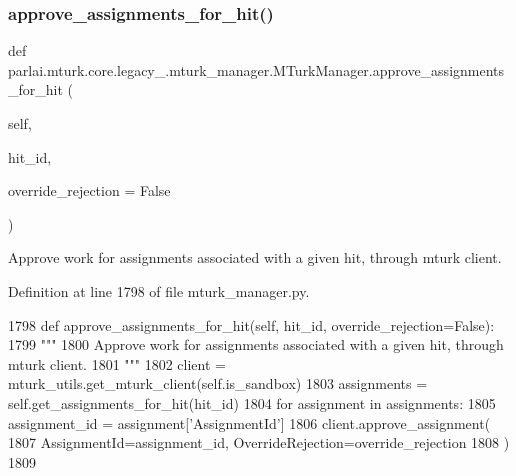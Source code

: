 \subsubsection{\texorpdfstring{approve\+\_\+assignments\+\_\+for\+\_\+hit()}{approve\_assignments\_for\_hit()}}
{\footnotesize\ttfamily def parlai.\+mturk.\+core.\+legacy\+\_.\+mturk\+\_\+manager.\+M\+Turk\+Manager.\+approve\+\_\+assignments\+\_\+for\+\_\+hit (\begin{DoxyParamCaption}\item[{}]{self,  }\item[{}]{hit\+\_\+id,  }\item[{}]{override\+\_\+rejection = {\ttfamily False} }\end{DoxyParamCaption})}

\begin{DoxyVerb}Approve work for assignments associated with a given hit, through mturk client.
\end{DoxyVerb}
 

Definition at line 1798 of file mturk\+\_\+manager.\+py.


\begin{DoxyCode}
1798     \textcolor{keyword}{def }approve\_assignments\_for\_hit(self, hit\_id, override\_rejection=False):
1799         \textcolor{stringliteral}{"""}
1800 \textcolor{stringliteral}{        Approve work for assignments associated with a given hit, through mturk client.}
1801 \textcolor{stringliteral}{        """}
1802         client = mturk\_utils.get\_mturk\_client(self.is\_sandbox)
1803         assignments = self.get\_assignments\_for\_hit(hit\_id)
1804         \textcolor{keywordflow}{for} assignment \textcolor{keywordflow}{in} assignments:
1805             assignment\_id = assignment[\textcolor{stringliteral}{'AssignmentId'}]
1806             client.approve\_assignment(
1807                 AssignmentId=assignment\_id, OverrideRejection=override\_rejection
1808             )
1809 
\end{DoxyCode}
\mbox{\label{classparlai_1_1mturk_1_1core_1_1legacy__2018_1_1mturk__manager_1_1MTurkManager_a3b905755ae6905ca640e831ce95c6e85}} 
